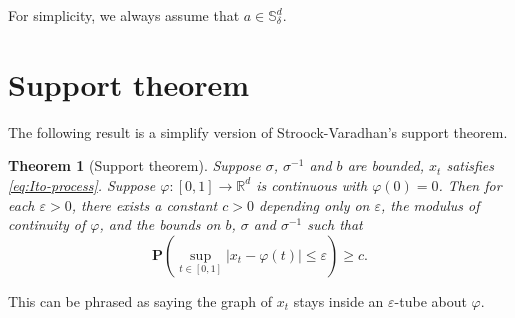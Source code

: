 \documentclass[twoside, 12pt]{book}
\numberwithin{equation}{chapter}
\newtheorem{theorem}{Theorem}[section]
\def\mR{{\mathbb R}}
\def\mS{{\mathbb S}}
\def\bP{{\mathbf P}}
\def\l{\left}
\def\r{\right}
\def\geq{\geqslant}
\def\leq{\leqslant}
\def\eps{\varepsilon}
\begin{document}
	For simplicity,  we always assume that $a\in \mS^d_{\delta}$. 
	
	\section{Support theorem} 
	The following result is a simplify version of Stroock-Varadhan's support theorem. 
	\begin{theorem}[Support theorem]
		Suppose $\sigma$, $\sigma^{-1}$ and $b$ are bounded, $x_t$ satisfies \eqref{eq:Ito-process}. Suppose $\varphi: [0,1]\to \mR^d$ is continuous with $\varphi(0)=0$. Then for each $\eps>0$, there exists a constant $c>0$ depending only on $\eps$, the modulus of continuity of $\varphi$, and the bounds on $b$, $\sigma$ and $\sigma^{-1}$ such that 
		\begin{equation}\label{Eq-support}
			\bP\l(\sup_{t\in [0,1]}|x_t-\varphi(t)|\leq \eps\r)\geq c. 
		\end{equation}
	\end{theorem}\label{thm:support}
	This can be phrased as saying the graph of $x_t$ stays inside an $\eps$-tube about $\varphi$. 
	
\end{document}
